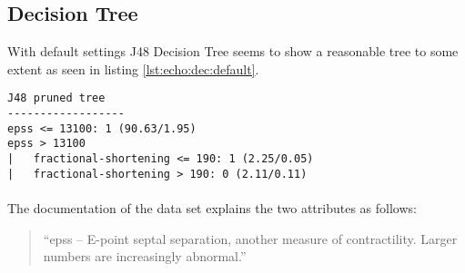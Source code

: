 \documentclass[paper=a4, fontsize=11pt]{scrartcl} %
\numberwithin{equation}{section} %
\numberwithin{figure}{section} %
\numberwithin{table}{section} %
\begin{document}
%
%


\subsection{Decision Tree}

With default settings J48 Decision Tree seems to show a reasonable tree to some extent as seen in listing \ref{lst:echo:dec:default}.

\begin{lstlisting}[label=lst:echo:dec:default, caption={Vizualization of Decision Tree on echocardiogram data -- Default Settings}]
J48 pruned tree
------------------
epss <= 13100: 1 (90.63/1.95)
epss > 13100
|   fractional-shortening <= 190: 1 (2.25/0.05)
|   fractional-shortening > 190: 0 (2.11/0.11)
\end{lstlisting}

\paragraph{}The documentation of the data set explains the two attributes as follows:

\begin{quote}
``epss -- E-point septal separation, another measure of contractility. Larger numbers are increasingly abnormal.''
\end{quote}
\end{document}
